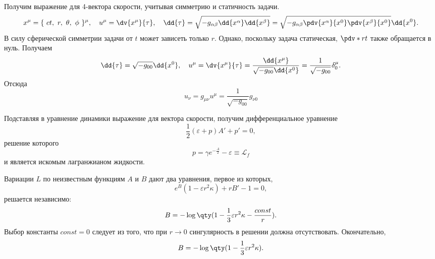 \documentclass[\docroot/reports/draft/report.tex]{subfiles}
\begin{document}
    Получим выражение для 4-вектора скорости, учитывая симметрию и статичность задачи.
    \begin{equation*}
        x^\mu = \{\ ct,\ r,\ \theta,\ \phi \ \}^\mu , \quad
        u^\mu = \dv{x^\mu}{\tau} , \quad
        \dd{\tau} = \sqrt{ - g_{\alpha\beta} \dd{x^\alpha} \dd{x^\beta} }
                  = \sqrt{ - g_{\alpha\beta} \pdv{x^\alpha}{x^0} \pdv{x^\beta}{x^0} } \dd{x^0} .
    \end{equation*}
    В силу сферической симметрии задачи от $t$ может зависеть только $r$. Однако, поскольку задача статическая, $\pdv*{r}{t}$ также обращается в нуль. Получаем
    \begin{equation*}
        \dd{\tau} = \sqrt{ - g_{00} } \dd{x^0} , \quad
        u^\mu = \dv{x^\mu}{\tau}
              = \frac{\dd{x^\mu}}{\sqrt{- g_{00}} \dd{x^0}}
              = \frac{1}{\sqrt{- g_{00}}} \delta^\mu_0 .
    \end{equation*}
    Отсюда
    \begin{equation*}
        u_\nu = g_{\mu\nu} u^\mu = \frac{1}{\sqrt{- g_{00}}} g_{\nu 0}
    \end{equation*}

    Подставляя в уравнение динамики выражение для вектора скорости, получим дифференциальное уравнение
    \begin{equation*}
        \frac{1}{2} (\varepsilon + p) A' + p' = 0 ,
    \end{equation*}
    решение которого
    \begin{equation*}
        p = \gamma e^{-\frac{A}{2}} - \varepsilon \equiv \mathcal{L}_f
    \end{equation*}
    и является искомым лагранжианом жидкости.

    Вариации $L$ по неизвестным функциям $A$ и $B$ дают два уравнения, первое из которых,
    \begin{equation*}
        e^B (1 - \varepsilon r^2 \kappa) + r B' - 1 = 0 ,
    \end{equation*}
    решается независимо:
    \begin{equation*}
        B = - \log\qty(1 - \frac{1}{3} \varepsilon r^2 \kappa - \frac{const}{r}) .
    \end{equation*}
    Выбор константы $const = 0$ следует из того, что при $r \to 0$ сингулярность в решении должна отсутствовать. Окончательно,
    \begin{equation*}
        B = - \log\qty(1 - \frac{1}{3} \varepsilon r^2 \kappa) .
    \end{equation*}
\end{document}

